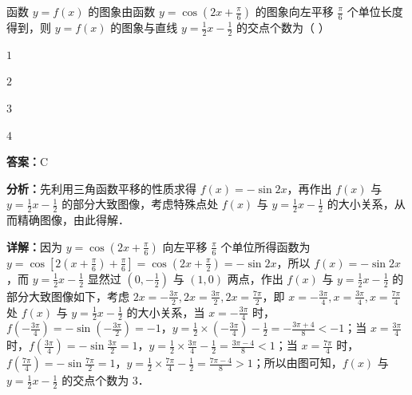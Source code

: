 \begin{question}[points=5]
函数 $y = f(x)$ 的图象由函数 $y = \cos\left(2x + \frac{\pi}{6}\right)$ 的图象向左平移 $\frac{\pi}{6}$ 个单位长度得到，则 $y = f(x)$ 的图象与直线 $y = \frac{1}{2}x - \frac{1}{2}$ 的交点个数为（                  ）
\begin{choices}
  \item $1$
  \item $2$
  \item $3$
  \item $4$
\end{choices}
\begin{solution}
\textbf{答案：}C

\textbf{分析：}先利用三角函数平移的性质求得 $f(x) = -\sin 2x$，再作出 $f(x)$ 与 $y = \frac{1}{2}x - \frac{1}{2}$ 的部分大致图像，考虑特殊点处 $f(x)$ 与 $y = \frac{1}{2}x - \frac{1}{2}$ 的大小关系，从而精确图像，由此得解．

\textbf{详解：}因为 $y = \cos\left(2x + \frac{\pi}{6}\right)$ 向左平移 $\frac{\pi}{6}$ 个单位所得函数为 $y = \cos\left[2\left(x + \frac{\pi}{6}\right) + \frac{\pi}{6}\right] = \cos\left(2x + \frac{\pi}{2}\right) = -\sin 2x$，所以 $f(x) = -\sin 2x$，而 $y = \frac{1}{2}x - \frac{1}{2}$ 显然过 $(0, -\frac{1}{2})$ 与 $(1,0)$ 两点，作出 $f(x)$ 与 $y = \frac{1}{2}x - \frac{1}{2}$ 的部分大致图像如下，考虑 $2x = -\frac{3\pi}{2}, 2x = \frac{3\pi}{2}, 2x = \frac{7\pi}{2}$，即 $x = -\frac{3\pi}{4}, x = \frac{3\pi}{4}, x = \frac{7\pi}{4}$ 处 $f(x)$ 与 $y = \frac{1}{2}x - \frac{1}{2}$ 的大小关系，当 $x = -\frac{3\pi}{4}$ 时，$f(-\frac{3\pi}{4}) = -\sin\left(-\frac{3\pi}{2}\right) = -1$，$y = \frac{1}{2}\times\left(-\frac{3\pi}{4}\right) - \frac{1}{2} = -\frac{3\pi+4}{8} < -1$；当 $x = \frac{3\pi}{4}$ 时，$f(\frac{3\pi}{4}) = -\sin\frac{3\pi}{2} = 1$，$y = \frac{1}{2}\times\frac{3\pi}{4} - \frac{1}{2} = \frac{3\pi-4}{8} < 1$；当 $x = \frac{7\pi}{4}$ 时，$f(\frac{7\pi}{4}) = -\sin\frac{7\pi}{2} = 1$，$y = \frac{1}{2}\times\frac{7\pi}{4} - \frac{1}{2} = \frac{7\pi-4}{8} > 1$；所以由图可知，$f(x)$ 与 $y = \frac{1}{2}x - \frac{1}{2}$ 的交点个数为 3．
\end{solution}
\end{question}

